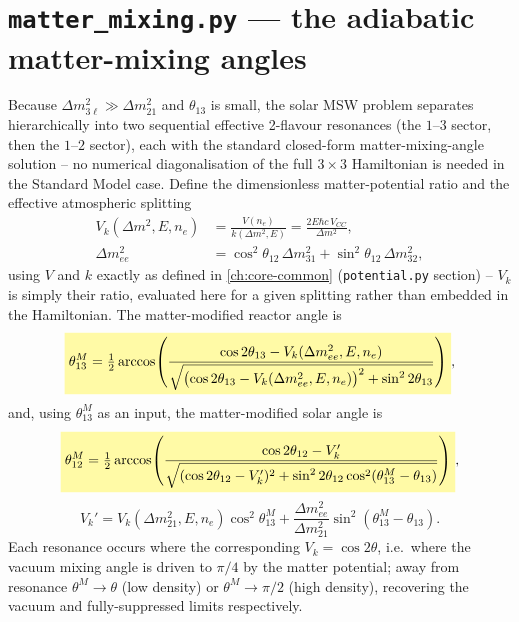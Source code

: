 \section{\texttt{matter\_mixing.py} --- the adiabatic matter-mixing angles}
\label{sec:solar-matter-mixing}


\begin{theorybox}
Because $\Delta m^2_{3\ell}\gg\Delta m^2_{21}$ and $\theta_{13}$ is small,
the solar MSW problem separates hierarchically into two sequential
effective 2-flavour resonances (the $1$--$3$ sector, then the $1$--$2$
sector), each with the standard closed-form matter-mixing-angle solution
\parencite{GiuntiKim2007} -- no numerical diagonalisation of the full
$3\times3$ Hamiltonian is needed in the Standard Model case. Define the
dimensionless matter-potential ratio and the effective atmospheric
splitting
\begin{align}
  V_k(\Delta m^2,E,n_e) &= \frac{V(n_e)}{k(\Delta m^2,E)}
  = \frac{2E\hbar c\,V_{CC}}{\Delta m^2}, \\
  \Delta m^2_{ee} &= \cos^2\theta_{12}\,\Delta m^2_{31} + \sin^2\theta_{12}\,\Delta m^2_{32},
\end{align}
using $V$ and $k$ exactly as defined in \cref{ch:core-common}
(\texttt{potential.py} section) -- $V_k$ is simply their ratio, evaluated
here for a given splitting rather than embedded in the Hamiltonian. The
matter-modified reactor angle is
\begin{equation}
  \keyresult{\theta_{13}^M = \tfrac12\arccos\!\left(
    \frac{\cos2\theta_{13}-V_k(\Delta m^2_{ee},E,n_e)}
         {\sqrt{\bigl(\cos2\theta_{13}-V_k(\Delta m^2_{ee},E,n_e)\bigr)^2+\sin^22\theta_{13}}}
  \right)},
\end{equation}
and, using $\theta_{13}^M$ as an input, the matter-modified solar angle is
\begin{equation}
  \keyresult{\theta_{12}^M = \tfrac12\arccos\!\left(
    \frac{\cos2\theta_{12}-V_k'}
         {\sqrt{(\cos2\theta_{12}-V_k')^2+\sin^22\theta_{12}\cos^2(\theta_{13}^M-\theta_{13})}}
  \right)},
\end{equation}
\begin{equation}
  V_k' = V_k(\Delta m^2_{21},E,n_e)\cos^2\theta_{13}^M
       + \frac{\Delta m^2_{ee}}{\Delta m^2_{21}}\sin^2(\theta_{13}^M-\theta_{13}).
\end{equation}
Each resonance occurs where the corresponding $V_k=\cos2\theta$, i.e.\
where the vacuum mixing angle is driven to $\pi/4$ by the matter
potential; away from resonance $\theta^M\to\theta$ (low density) or
$\theta^M\to\pi/2$ (high density), recovering the vacuum and
fully-suppressed limits respectively.
\end{theorybox}

